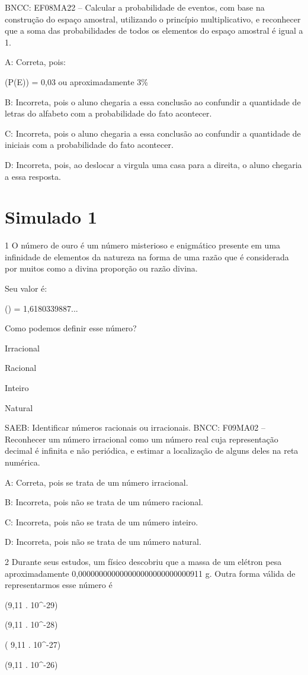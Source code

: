 {BNCC: EF08MA22 -- Calcular a probabilidade de eventos, com base na
construção do espaço amostral, utilizando o princípio multiplicativo, e
reconhecer que a soma das probabilidades de todos os elementos do espaço
amostral é igual a 1.

A: Correta, pois:

(P(E)) = 0,03 ou aproximadamente 3\%

B: Incorreta, pois o aluno chegaria a essa conclusão ao confundir a
quantidade de letras do alfabeto com a probabilidade do fato acontecer.

C: Incorreta, pois o aluno chegaria a essa conclusão ao confundir a
quantidade de iniciais com a probabilidade do fato acontecer.

D: Incorreta, pois, ao deslocar a virgula uma casa para a direita, o
aluno chegaria a essa resposta.


\section{Simulado 1}

\num{1} O número de ouro é um número misterioso e enigmático presente em uma
infinidade de elementos da natureza na forma de uma razão que é
considerada por muitos como a divina proporção ou razão divina.

Seu valor é:

() = 1,6180339887...

Como podemos definir esse número?
\item Irracional
\item Racional
\item Inteiro
\item Natural

SAEB: Identificar números racionais ou irracionais. BNCC: F09MA02 --
Reconhecer um número irracional como um número real cuja representação
decimal é infinita e não periódica, e estimar a localização de alguns
deles na reta numérica.

A: Correta, pois se trata de um número irracional.

B: Incorreta, pois não se trata de um número racional.

C: Incorreta, pois não se trata de um número inteiro.

D: Incorreta, pois não se trata de um número natural.

\num{2} Durante seus estudos, um físico descobriu que a massa de um elétron
pesa aproximadamente 0,000000000000000000000000000911 g. Outra forma
válida de representarmos esse número é
\item (9,11 . 10^{-29})
\item (9,11 . 10^{-28})
\item ( 9,11 . 10^{-27})
\item (9,11 . 10^{-26})

}
